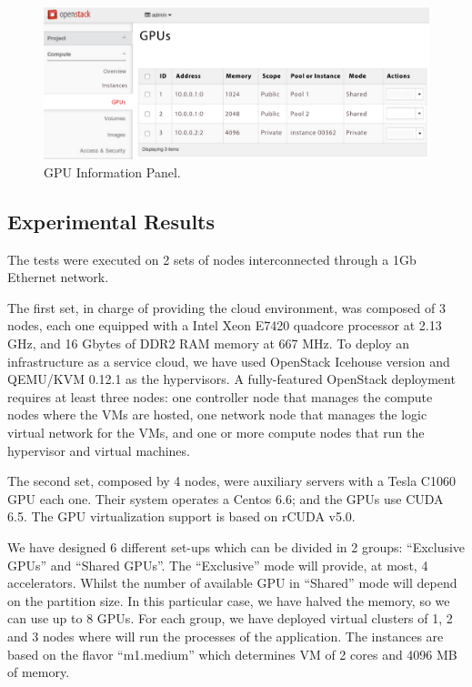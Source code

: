 \documentclass[a4paper,twoside]{article}
\begin{document}
\begin{figure}[htb]
  \centering
  \includegraphics[width=\linewidth]{images/UI-rgpus.pdf}
  \caption{GPU Information Panel.}
  \label{fig:ui-rgpus}
\end{figure}

\subsection{Experimental Results}
The tests were executed on 2 sets of nodes interconnected through a 1Gb Ethernet network.

The first set, in charge of providing the cloud environment,
was composed of 3 nodes, each one equipped with a Intel Xeon E7420 quadcore processor at
2.13 GHz, and 16 Gbytes of DDR2 RAM memory at 667 MHz.
To deploy an infrastructure as a service cloud, we have used OpenStack Icehouse version and QEMU/KVM 0.12.1 as the hypervisors.
A fully-featured OpenStack deployment requires at least three nodes: one controller node that manages the compute nodes 
where the VMs are hosted, one network node that manages the logic
virtual network for the VMs, and one or more compute nodes that 
run the hypervisor and virtual machines.

The second set, composed by 4 nodes, were auxiliary servers with a Tesla C1060 GPU each one. 
Their system operates a Centos 6.6; and the GPUs use CUDA 6.5. 
The GPU virtualization support is based on rCUDA v5.0. 

We have designed 6 different set-ups which can be divided
in 2 groups: “Exclusive GPUs” and “Shared GPUs”. The
“Exclusive” mode will provide, at most, 4 accelerators. Whilst
the number of available GPU in “Shared” mode will depend
on the partition size. In this particular case, we have halved
the memory, so we can use up to 8 GPUs. For each group, we
have deployed virtual clusters of 1, 2 and 3 nodes where will
run the processes of the application. The instances are based
on the flavor “m1.medium” which determines VM of 2 cores
and 4096 MB of memory.
\end{document}
